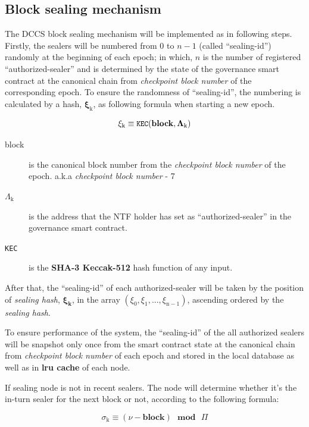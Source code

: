 \documentclass[12pt,oneside]{amsart}
\begin{document}
\begin{multicols}{2}
\section{Block sealing mechanism}\label{sec:sealing}
The {\small DCCS} block sealing mechanism will be implemented  as in following steps. Firstly, the sealers will be numbered from $0$ to $n - 1$ (called ``sealing-id'') randomly at the beginning of each epoch; in which, $n$ is the number of registered ``authorized-sealer'' and is determined by the state of the governance smart contract at the canonical chain from \textit{checkpoint block number} of the corresponding epoch. To ensure the randomness of ``sealing-id'', the numbering is calculated by a hash,  $\boldsymbol{\xi_{\mathrm{k}}}$, as following formula when starting a new epoch.

\begin{equation}
\xi_{\mathrm{k}} \equiv \texttt{\small KEC}(\mathbf{block}, \mathbf{\Lambda_{\mathrm{k}}})
\end{equation}

\begin{description}
\item[block] is the canonical block number from the \textit{checkpoint block number} of the epoch. a.k.a \textit{checkpoint block number} - 7
\item[$\Lambda_{\mathrm{k}}$] is the address that the {\small NTF} holder has set as ``authorized-sealer'' in the governance smart contract.
\item[\texttt{\small KEC}] is the \textbf{\small {SHA-3 Keccak-512}} hash function of any input.
\end{description}

After that, the ``sealing-id'' of each authorized-sealer will be taken by the position of \textit{sealing hash}, $\boldsymbol{\xi_k}$, in the array $(\xi_{\mathrm{0}}, \xi_{\mathrm{1}}, ..., \xi_{\mathrm{n-1}})$, ascending ordered by the \textit{sealing hash}.

To ensure performance of the system, the ``sealing-id'' of the all authorized sealers will be snapshot only once from the smart contract state at the canonical chain from \textit{checkpoint block number} of each epoch and stored in the local database as well as in \textbf{lru cache} of each node.

If sealing node is not in recent sealers. The node will determine whether it's the in-turn sealer for the next block or not, according to the following formula:

\begin{equation}\label{eq:sigma}
\sigma_{\mathrm{k}} \equiv (\nu - \mathbf{block}) \ \ \ \mathbf{mod} \ \ \ \Pi
\end{equation}


\end{multicols}
\end{document}
